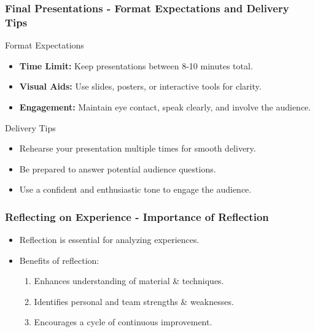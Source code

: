 \documentclass[aspectratio=169]{beamer}
\begin{document}
\begin{frame}[fragile]
    \frametitle{Final Presentations - Format Expectations and Delivery Tips}
    \begin{block}{Format Expectations}
        \begin{itemize}
            \item \textbf{Time Limit:} Keep presentations between 8-10 minutes total.
            \item \textbf{Visual Aids:} Use slides, posters, or interactive tools for clarity.
            \item \textbf{Engagement:} Maintain eye contact, speak clearly, and involve the audience.
        \end{itemize}
    \end{block}
    
    \begin{block}{Delivery Tips}
        \begin{itemize}
            \item Rehearse your presentation multiple times for smooth delivery.
            \item Be prepared to answer potential audience questions.
            \item Use a confident and enthusiastic tone to engage the audience.
        \end{itemize}
    \end{block}
\end{frame}

\begin{frame}[fragile]
    \frametitle{Reflecting on Experience - Importance of Reflection}
    \begin{itemize}
        \item Reflection is essential for analyzing experiences.
        \item Benefits of reflection:
        \begin{enumerate}
            \item Enhances understanding of material & techniques.
            \item Identifies personal and team strengths & weaknesses.
            \item Encourages a cycle of continuous improvement.
        \end{enumerate}
    \end{itemize}
\end{frame}
\end{document}

